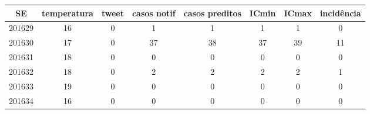 \begin{tabular}{c|ccccccc}
  \hline
SE & temperatura & tweet & casos notif & casos preditos & ICmin & ICmax & incidência \\ 
  \hline
201629 & 16 & 0 & 1 & 1 & 1 & 1 & 0 \\ 
  201630 & 17 & 0 & 37 & 38 & 37 & 39 & 11 \\ 
  201631 & 18 & 0 & 0 & 0 & 0 & 0 & 0 \\ 
  201632 & 18 & 0 & 2 & 2 & 2 & 2 & 1 \\ 
  201633 & 19 & 0 & 0 & 0 & 0 & 0 & 0 \\ 
  201634 & 16 & 0 & 0 & 0 & 0 & 0 & 0 \\ 
   \hline
\end{tabular}

